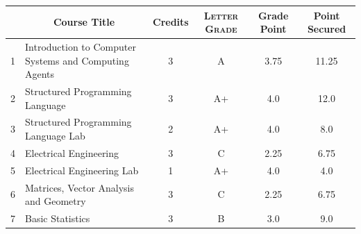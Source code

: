 \documentclass[11pt]{article}
\newcommand*{\numtwo}[1]{\pgfmathprintnumber[
                    fixed, precision=2, fixed zerofill=true]{#1}}
\begin{document}
                \begin{center}
                    \renewcommand{\arraystretch}{1.08}
                    
                \begin{tabular}{|c|l|c|>{\scshape}c|c|c|}
                \hline  \rule[-1ex]{0pt}{3.5ex} {\centering{\bf Course Code}} &  \multicolumn{1}{c|}{\textbf{Course Title}}  & {\bf Credits} & {\bf Letter Grade} & {\bf Grade Point} & {\bf Point Secured}  \\ 
                \hline   1 &  Introduction to Computer Systems and Computing Agents		 & 3 & A & 3.75 & 11.25 \\ %
                \hline   2 &  Structured Programming Language		 & 3 & A+ & 4.0 & 12.0 \\ %
                \hline   3 &  Structured Programming Language Lab		 & 2 & A+ & 4.0 & 8.0 \\ %
                \hline   4 &  Electrical Engineering		 & 3 & C & 2.25 & 6.75 \\ %
                \hline   5 &  Electrical Engineering Lab		 & 1 & A+ & 4.0 & 4.0 \\ %
                \hline   6 &  Matrices, Vector Analysis and Geometry		 & 3 & C & 2.25 & 6.75 \\ %
                \hline   7 &  Basic Statistics		 & 3 & B & 3.0 & 9.0 \\ %

\hline                %
                \end{tabular}
                \end{center}
                \renewcommand{\arraystretch}{1.03}
\end{document}

